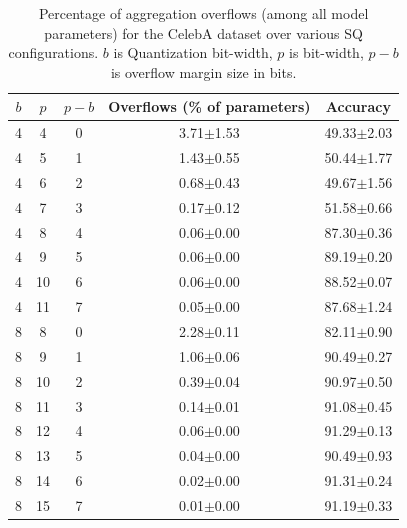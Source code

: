 \begin{table}[!ht]
    \caption{Percentage of aggregation overflows (among all model parameters) for the CelebA dataset over various SQ configurations. $b$ is Quantization bit-width, $p$ is \SecAgg bit-width, $p-b$ is overflow margin size in bits.}
    \centering
    \begin{tabular}{ccccc}
    \toprule
    $b$ & $p$ & $p - b$ & Overflows (\% of parameters) & Accuracy \\
    \midrule
        4 & 4 & 0 & 3.71$\pm$1.53 & 49.33$\pm$2.03 \\
        4 & 5 & 1 & 1.43$\pm$0.55 & 50.44$\pm$1.77 \\
        4 & 6 & 2 & 0.68$\pm$0.43 & 49.67$\pm$1.56 \\
        4 & 7 & 3 & 0.17$\pm$0.12 & 51.58$\pm$0.66 \\
        4 & 8 & 4 & 0.06$\pm$0.00 & 87.30$\pm$0.36 \\
        4 & 9 & 5 & 0.06$\pm$0.00 & 89.19$\pm$0.20 \\
        4 & 10 & 6 & 0.06$\pm$0.00 & 88.52$\pm$0.07 \\
        4 & 11 & 7 & 0.05$\pm$0.00 & 87.68$\pm$1.24 \\
        \midrule
        8 & 8 & 0 & 2.28$\pm$0.11 & 82.11$\pm$0.90 \\
        8 & 9 & 1 & 1.06$\pm$0.06 & 90.49$\pm$0.27 \\
        8 & 10 & 2 & 0.39$\pm$0.04 & 90.97$\pm$0.50 \\
        8 & 11 & 3 & 0.14$\pm$0.01 & 91.08$\pm$0.45 \\
        8 & 12 & 4 & 0.06$\pm$0.00 & 91.29$\pm$0.13 \\
        8 & 13 & 5 & 0.04$\pm$0.00 & 90.49$\pm$0.93 \\
        8 & 14 & 6 & 0.02$\pm$0.00 & 91.31$\pm$0.24 \\
        8 & 15 & 7 & 0.01$\pm$0.00 & 91.19$\pm$0.33 \\
        \bottomrule
    \end{tabular}
    \label{tab:celeba_overflows}
\end{table}

